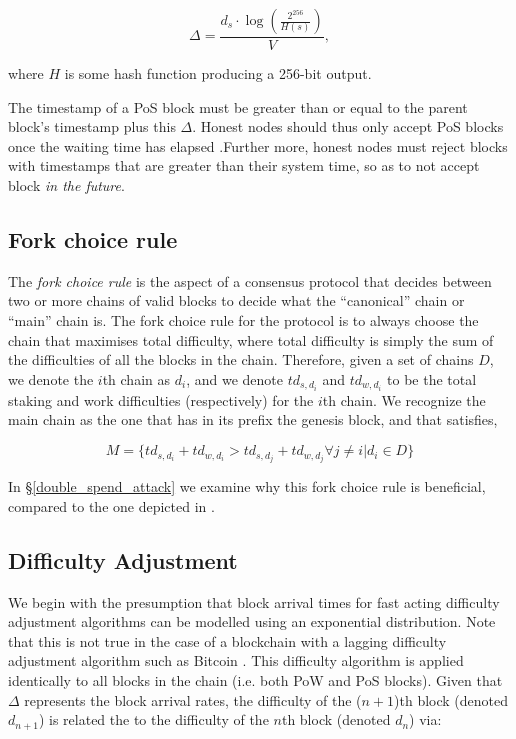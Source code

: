 $$\Delta = \frac{d_s \cdot \log (\frac{2^{256}}{H(s)})}{V},$$

where $H$ is some hash function producing a 256-bit output.

The timestamp of a PoS block must be greater than or equal to the parent block's timestamp plus this $\Delta$. Honest nodes should thus only accept PoS blocks once the waiting time has elapsed .Further more, honest nodes must reject blocks with timestamps that are greater than their system time, so as to not accept block \emph{in the future}.  


\subsection{Fork choice rule}
\label{fork}

The \emph{fork choice rule} is the aspect of a consensus protocol that decides between two or more chains of valid blocks to decide what the ``canonical'' chain or ``main'' chain is. The fork choice rule for the protocol is to always choose the chain that maximises total difficulty, where total difficulty is simply the sum of the difficulties of all the blocks in the chain. Therefore, given a set of chains $D$, we denote the $i$th chain as $d_i$, and we denote $td_{s, d_i}$ and $td_{w, d_i}$ to be the total staking and work difficulties (respectively) for the $i$th chain. We recognize the main chain as the one that has in its prefix the genesis block, and that satisfies,

\begin{equation}
    M = \{td_{s, d_i} + td_{w, d_i} > td_{s, d_j} + td_{w, d_j} \forall j \neq i | d_i \in D \}
\end{equation}

In \S\ref{double_spend_attack} we examine why this fork choice rule is beneficial, compared to the one depicted in \cite{wu2019unifying}.

\subsection{Difficulty Adjustment}
\label{difficulty_adjustment}

We begin with the presumption that block arrival times for fast acting difficulty adjustment algorithms can be modelled using an exponential distribution. Note that this is not true in the case of a blockchain with a lagging difficulty adjustment algorithm such as Bitcoin \cite{block_arrivals}. This difficulty algorithm is applied identically to all blocks in the chain (i.e. both PoW and PoS blocks). Given that $\Delta$ represents the block arrival rates, the difficulty of the ($n+1$)th block (denoted $d_{n+1}$) is related the to the difficulty of the $n$th block (denoted $d_n$) via:

